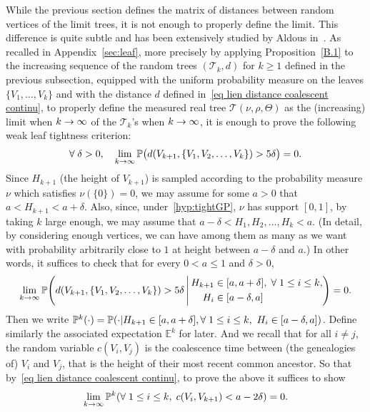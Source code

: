 \documentclass[AHL,Unicode,published]{cedram}
\newcommand{\probak}[1]{\mathbb{P}^k\left(#1\right)}
\renewcommand{\P}{{\mathbb{P}}}
\newcommand{\E}{\mathbb{E}}
\newcommand{\1}{\mathbbm{1}}
\newcommand{\T}{\mathcal{T}}
\let\originalleft\left
\let\originalright\right
\renewcommand{\left}{\mathopen{}\mathclose\bgroup\originalleft}
\renewcommand{\right}{\aftergroup\egroup\originalright}
\renewcommand*{\to}{\mathchoice{\longrightarrow}{\rightarrow}{\rightarrow}{\rightarrow}}
\let\oldforall\forall
\renewcommand*{\forall}{\mathrel{\oldforall}}
\begin{document}
While the previous section defines the matrix of distances between random vertices of the limit trees, it is not enough to properly define the limit. This difference is quite subtle and has been extensively studied by Aldous in~\cite{Ald93}. As recalled in Appendix~\ref{sec:leaf}, {more precisely by applying Proposition~\ref{B.1} to the increasing sequence of the random trees $(\T_k,d)$ for $k\ge 1$ defined in the previous subsection, equipped with the uniform probability measure on the leaves $\{V_1, \dots, V_k\}$ and with the distance $d$ defined in~\eqref{eq lien distance coalescent continu},} to properly define the {measured real tree $\T(\nu, \rho, \Theta)$ as the (increasing) limit when $k\to \infty$ of the $\T_k$'s when $k\to \infty$,} it is enough to prove the following weak leaf tightness criterion:
\[
\forall \delta>0, \quad \lim_{k\to \infty} \mathbb{P} \bigl(d(V_{k+1},\{V_1,V_2,\dots, V_k\})>{5}\delta\bigr)=0.
\]
Since $H_{k+1}$ (the height of $V_{k+1}$) is sampled according to the probability measure $\nu$ which satisfies $\nu(\{0\})=0$, we may assume for some $a>0$ that $a<H_{k+1}<a+\delta$. Also, since, under~\ref{hyp:tightGP}, $\nu$ has support $[0,1]${,} by taking $k$ large enough, we may assume that $a-\delta<H_1,H_2,\dots, H_k<a$. ({In} detail, by considering enough vertices, we can have among them as many as we want {with probability arbitrarily close to $1$} at height between $a-\delta$ and $a$.) In other words, it suffices to check that for every $0<a\leq 1$ and $\delta>0$,
\begin{align*}
\lim_{k\to \infty} \mathbb{P}\left(
d(V_{k+1},\{V_1,V_2,\dots, V_k\})>{5}\delta \,\middle|\,
\begin{aligned}
H_{k+1} &\in [a,a+\delta],\;\forall 1\leq i \leq k,\\ 
H_i &\in[a-\delta,a]
\end{aligned}
\right)
=0.
\end{align*}
Then we write $\probak{\cdot}=\P(\cdot|H_{k+1}\in [a,a+\delta], \forall 1\leq i \leq k, \, \, H_i\in[a-\delta,a])$. Define similarly the associated expectation $\E^k$ for later. And we recall that for all $i\neq j$, the random variable $c(V_i,V_j)$ is the coalescence time between (the genealogies of) $V_i$ and $V_j$, that is the height of their most recent common ancestor. So that by~\eqref{eq lien distance coalescent continu}, to prove the above it suffices to show
\begin{equation}\label{eq:desired_limit_leaf_tight}
\lim_{k\to \infty} \probak{\forall 1\leq i \leq k, \; c(V_i,V_{k+1})<a-2\delta}=0.
\end{equation}
\end{document}
